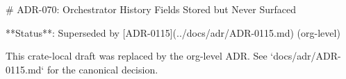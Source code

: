 # ADR-070: Orchestrator History Fields Stored but Never Surfaced

**Status**: Superseded by [ADR-0115](../docs/adr/ADR-0115.md) (org-level)

This crate-local draft was replaced by the org-level ADR. See `docs/adr/ADR-0115.md` for the canonical decision.
